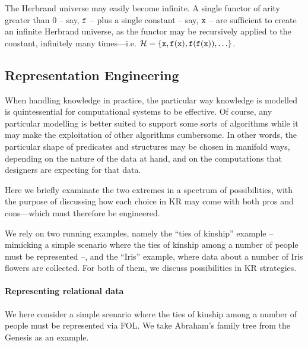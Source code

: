 \documentclass[12pt,a4paper,openright,twoside]{book}
\begin{document}
The Herbrand universe may easily become infinite.
%
A single functor of arity greater than 0 -- say, $\mathtt{f}$ -- plus a single constant -- say, $\mathtt{x}$ -- are sufficient to create an infinite Herbrand universe, as the functor may be recursively applied to the constant, infinitely many times---i.e. $\mathcal{H} = \{ \mathtt{x}, \mathtt{f}(\mathtt{x}), \mathtt{f}(\mathtt{f}(\mathtt{x})), \ldots \}$.

\subsection{Representation Engineering}

When handling knowledge in practice, the particular way knowledge is modelled is quintessential for computational systems to be effective.
%
Of course, any particular modelling is better suited to support some sorts of algorithms while it may make the exploitation of other algorithms cumbersome.
%
In other words, the particular shape of predicates and structures may be chosen in manifold ways, depending on the nature of the data at hand, and on the computations that designers are expecting for that data.

Here we briefly examinate the two extremes in a spectrum of possibilities, with the purpose of discussing how each choice in KR may come with both pros and cons---which must therefore be engineered.

We rely on two running examples, namely the ``ties of kinship'' example -- mimicking a simple scenario where the ties of kinship among a number of people must be represented --, and the ``Iris'' example, where data about a number of Iris flowers are collected.
%
For both of them, we discuss possibilities in KR strategies.

\paragraph{Representing relational data}

We here consider a simple scenario where the ties of kinship among a number of people must be represented via FOL.
%
We take Abraham's family tree from the Genesis as an example.
\end{document}
